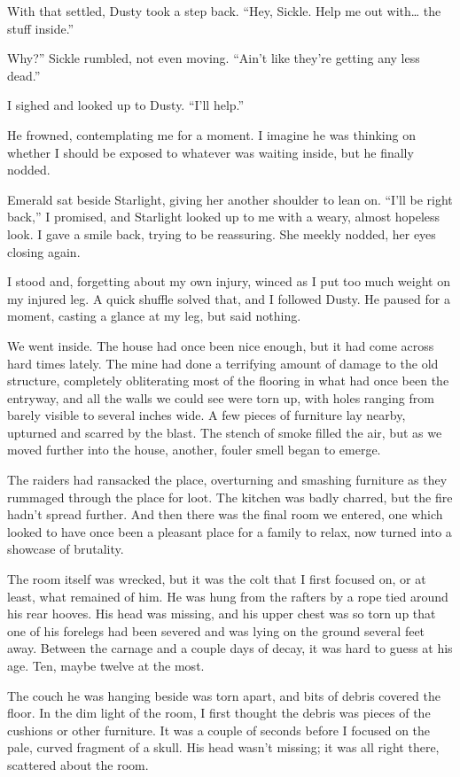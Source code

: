 With that settled, Dusty took a step back. “Hey, Sickle. Help me out with… the stuff inside.”

\leavevmode{}Why?” Sickle rumbled, not even moving. “Ain’t like they’re getting any less dead.”

I sighed and looked up to Dusty. “I’ll help.”

He frowned, contemplating me for a moment. I imagine he was thinking on whether I should be exposed to whatever was waiting inside, but he finally nodded.

Emerald sat beside Starlight, giving her another shoulder to lean on. “I’ll be right back,” I promised, and Starlight looked up to me with a weary, almost hopeless look. I gave a smile back, trying to be reassuring. She meekly nodded, her eyes closing again.

I stood and, forgetting about my own injury, winced as I put too much weight on my injured leg. A quick shuffle solved that, and I followed Dusty. He paused for a moment, casting a glance at my leg, but said nothing.

We went inside. The house had once been nice enough, but it had come across hard times lately. The mine had done a terrifying amount of damage to the old structure, completely obliterating most of the flooring in what had once been the entryway, and all the walls we could see were torn up, with holes ranging from barely visible to several inches wide. A few pieces of furniture lay nearby, upturned and scarred by the blast. The stench of smoke filled the air, but as we moved further into the house, another, fouler smell began to emerge.

The raiders had ransacked the place, overturning and smashing furniture as they rummaged through the place for loot. The kitchen was badly charred, but the fire hadn’t spread further. And then there was the final room we entered, one which looked to have once been a pleasant place for a family to relax, now turned into a showcase of brutality.

The room itself was wrecked, but it was the colt that I first focused on, or at least, what remained of him. He was hung from the rafters by a rope tied around his rear hooves. His head was missing, and his upper chest was so torn up that one of his forelegs had been severed and was lying on the ground several feet away. Between the carnage and a couple days of decay, it was hard to guess at his age. Ten, maybe twelve at the most.

The couch he was hanging beside was torn apart, and bits of debris covered the floor. In the dim light of the room, I first thought the debris was pieces of the cushions or other furniture. It was a couple of seconds before I focused on the pale, curved fragment of a skull. His head wasn’t missing; it was all right there, scattered about the room.


